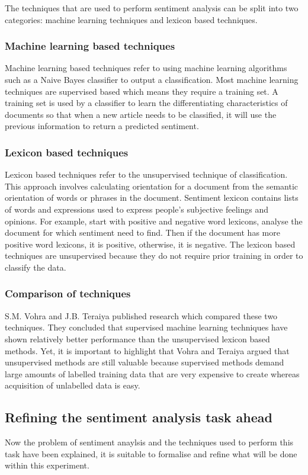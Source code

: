 \documentclass[a4paper,11pt]{report}
\begin{document}
The techniques that are used to perform sentiment analysis can be split into two categories: machine learning techniques and lexicon based techniques.

\subsubsection{Machine learning based techniques}
Machine learning based techniques refer to using machine learning algorithms such as a Naive Bayes classifier to output a classification. Most machine learning techniques are supervised based which means they require a training set. A training set is used by a  classifier to learn the differentiating characteristics of documents so that when a new article needs to be classified, it will use the previous information to return a predicted sentiment.

\subsubsection{Lexicon based techniques}
Lexicon based techniques refer to the unsupervised technique of classification. This approach involves calculating orientation for a document from the semantic orientation of words or phrases in the document. Sentiment lexicon contains lists of words and expressions used to express people’s subjective feelings and opinions. For example, start with positive and negative word lexicons, analyse the document for which sentiment need to find. Then if the document has more positive word lexicons, it is positive, otherwise, it is negative. The lexicon based techniques are unsupervised because they do not require prior training in order to classify the data.

\subsubsection{Comparison of techniques}
S.M. Vohra and J.B. Teraiya published research which compared these two techniques. They concluded that supervised machine learning techniques have shown relatively better performance than the unsupervised lexicon based methods. Yet, it is important to highlight that Vohra and Teraiya argued that unsupervised methods are still valuable because supervised methods demand large amounts of labelled training data that are very expensive to create whereas acquisition of unlabelled data is easy.

\subsection{Refining the sentiment analysis task ahead}
Now the problem of sentiment anaylsis and the techniques used to perform this task have been explained, it is suitable to formalise and refine what will be done within this experiment.
\end{document}
